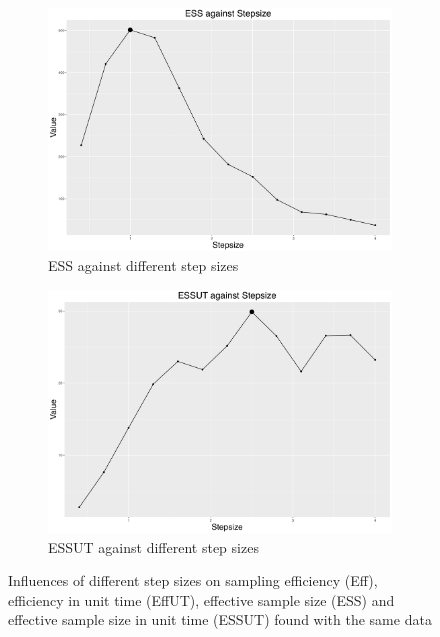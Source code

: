 \begin{figure}[h]
\begin{subfigure}[t]{0.45\textwidth}
	\includegraphics[width=\textwidth]{Chapters/05MCMCOU/plots/ggess.pdf}
	\caption{ESS against different step sizes}
\end{subfigure}
\begin{subfigure}[t]{0.45\textwidth}
	\includegraphics[width=\textwidth]{Chapters/05MCMCOU/plots/ggessut.pdf}
	\caption{ESSUT against different step sizes}
\end{subfigure}
\caption{Influences of different step sizes on sampling efficiency (Eff), efficiency in unit time (EffUT), effective sample size (ESS) and effective sample size in unit time (ESSUT) found with the same data}
\label{effeutessessutexamplefigure}
\end{figure}


